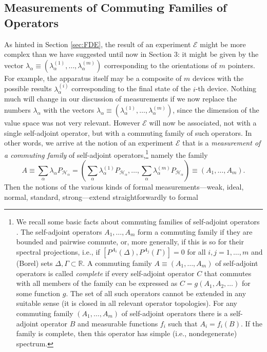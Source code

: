 \documentclass[12pt]{article}
\newcommand{\sa}{self-adjoint}
\newcommand{\avec}[2]{\mbox{${#1}_{1},\ldots,{#1}_{#2}$}}
\renewcommand{\a}{\alpha}
\newcommand{\la}{\lambda_{\a}}
\newcommand{\Pa}{ P_{ {\mathcal{H}_{\a} } } }
\newcommand{\R}{\mathbb{R}}
\newcommand{\E}{\mbox{$\mathscr{E}$}}
\begin{document}
\subsection{Measurements of Commuting Families of Operators}
\label{secMCFO}

As hinted in Section \ref{sec:FDE}, the result of an experiment \E{}
might be more complex than we have suggested until now in Section 3:
it might be given by the vector $\lambda_{\a}\equiv(
\la^{(1)},\ldots,\la^{(m)})$ corresponding to the orientations of $m$
pointers. For example, the apparatus itself may be a composite of $m$
devices with the possible results $\la^{(i)}$ corresponding to the
final state of the $i$-th device.  Nothing much will change in our
discussion of measurements if we now replace the numbers $\la$ with
the vectors ${\lambda}_{\a}\equiv( \la^{(1)},\ldots,\la^{(m)})$, since
the dimension of the value space was not very relevant. However \E{}
will now be associated, not with a single self-adjoint operator, but
with a commuting family of such operators. In other words, we arrive
at the notion of an experiment \E{} that is a \emph{measurement of a
   commuting family} of \sa{} operators,\footnote{We recall some basic
   facts about commuting families of \sa{} operators
   \cite{vNe55,RN55,Pru71}.  The \sa{} operators $\avec{A}{m}$ form a
   commuting family if they are bounded and pairwise commute, or, more
   generally, if this is so for their spectral projections, i.e., if
   $[P^{A_{i}} (\Delta), P^{A_{j}} (\Gamma)] =0$ for all $i,j =
   1,\ldots,m$ and (Borel) sets $\Delta, \Gamma \subset \R $.  A
   commuting family $A\equiv(\avec{A}{m})$ of \sa{} operators is called
   \emph{complete} if every \sa{} operator $C$ that commutes with all
   members of the family can be expressed as $C= g(A_1,A_2,\dots )$ for
   some function $g$. The set of all such operators cannot be extended
   in any suitable sense (it is closed in all relevant operator
   topologies).  For any commuting family $(\avec{A}{m})$ of \sa{}
   operators there is a \sa{} operator $B$ and measurable functions
   $f_i$ such that $A_i= f_i(B)$.  If the family is complete, then this
   operator has simple (i.e., nondegenerate) spectrum.}  namely the
family
\begin{equation}
{A} \equiv \sum_{\a} {\lambda}_{\a} \Pa = \left(\sum_{\a}\la^{(1)}
\Pa ,\ldots, \sum_{\a}\la^{(m)}\Pa\right) \equiv (\avec{A}{m}).
\label{eq:ccff}
\end{equation}
%
Then the notions of the various kinds of formal measurements---weak,
ideal, normal, standard, strong---extend straightforwardly to formal
\end{document}
